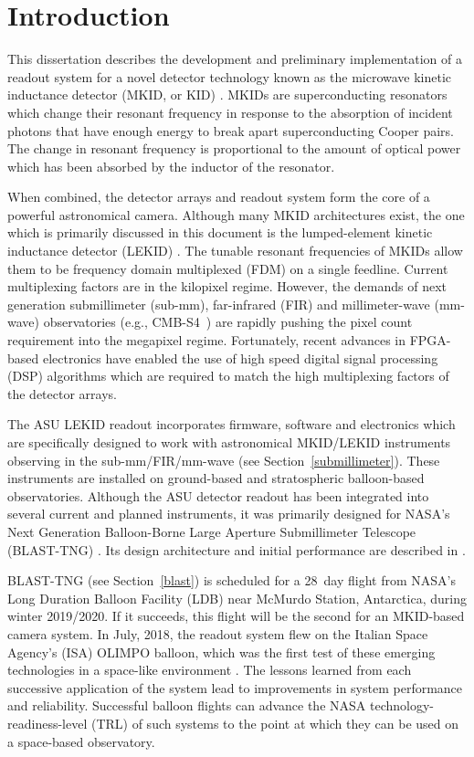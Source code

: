 \chapter{Introduction}\label{intro}

This dissertation describes the development and preliminary implementation of a readout system for a novel detector technology known as the microwave kinetic inductance detector (MKID, or KID) \citep{day2003broadband, mazin2005microwave}. MKIDs are superconducting resonators which change their resonant frequency in response to the absorption of incident photons that have enough energy to break apart superconducting Cooper pairs. The change in resonant frequency is proportional to the amount of optical power which has been absorbed by the inductor of the resonator.

When combined, the detector arrays and readout system form the core of a powerful astronomical camera. Although many MKID architectures exist, the one which is primarily discussed in this document is the lumped-element kinetic inductance detector (LEKID) \citep{doyle2008lumped}. The tunable resonant frequencies of MKIDs allow them to be frequency domain multiplexed (FDM) on a single feedline. Current multiplexing factors are in the kilopixel regime. However, the demands of next generation submillimeter (sub-mm), far-infrared (FIR) and millimeter-wave (mm-wave) observatories (e.g., CMB-S4~\citep{abitbol2017cmb}) are rapidly pushing the pixel count requirement into the megapixel regime. Fortunately, recent advances in FPGA-based electronics have enabled the use of high speed digital signal processing (DSP) algorithms which are required to match the high multiplexing factors of the detector arrays.

The ASU LEKID readout incorporates firmware, software and electronics which are specifically designed to work with astronomical MKID/LEKID instruments observing in the sub-mm/FIR/mm-wave (see Section~\ref{submillimeter}). These instruments are installed on ground-based and stratospheric balloon-based observatories. Although the ASU detector readout has been integrated into several current and planned instruments, it was primarily designed for NASA's Next Generation Balloon-Borne Large Aperture Submillimeter Telescope (BLAST-TNG) \citep{dober}. Its design architecture and initial performance are described in \citet{gordon2016}.

BLAST-TNG (see Section~\ref{blast}) is scheduled for a 28~day flight from NASA's Long Duration Balloon Facility (LDB) near McMurdo Station, Antarctica, during winter 2019/2020. If it succeeds, this flight will be the second for an MKID-based camera system. In July, 2018, the readout system flew on the Italian Space Agency's (ISA) OLIMPO balloon, which was the first test of these emerging technologies in a space-like environment \citep{masi2019kinetic}. The lessons learned from each successive application of the system lead to improvements in system performance and reliability. Successful balloon flights can advance the NASA technology-readiness-level (TRL) of such systems to the point at which they can be used on a space-based observatory.


